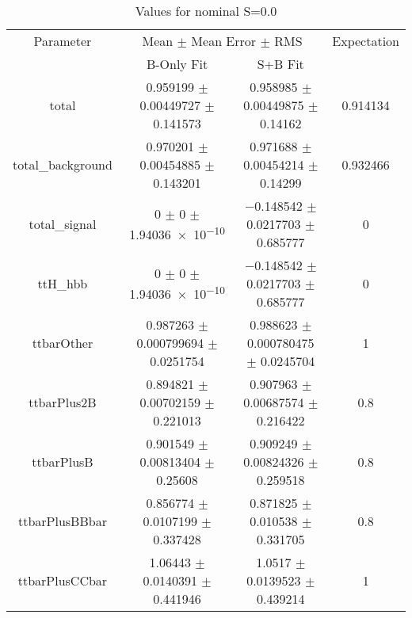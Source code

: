 \begin{table}
\centering
\caption{Values for nominal S=0.0}
\begin{tabular}{cccc}
\toprule
Parameter & \multicolumn{2}{c}{Mean $\pm$ Mean Error $\pm$ RMS} & Expectation\\
 & B-Only Fit & S+B Fit & \\
\midrule
total & \num{0.959199} $\pm$ \num{0.00449727} $\pm$ \num{0.141573} & \num{0.958985} $\pm$ \num{0.00449875} $\pm$ \num{0.14162} & \num{0.914134}\\
total\_background & \num{0.970201} $\pm$ \num{0.00454885} $\pm$ \num{0.143201} & \num{0.971688} $\pm$ \num{0.00454214} $\pm$ \num{0.14299} & \num{0.932466}\\
total\_signal & \num{0} $\pm$ \num{0} $\pm$ \num{1.94036e-10} & \num{-0.148542} $\pm$ \num{0.0217703} $\pm$ \num{0.685777} & \num{0}\\
ttH\_hbb & \num{0} $\pm$ \num{0} $\pm$ \num{1.94036e-10} & \num{-0.148542} $\pm$ \num{0.0217703} $\pm$ \num{0.685777} & \num{0}\\
ttbarOther & \num{0.987263} $\pm$ \num{0.000799694} $\pm$ \num{0.0251754} & \num{0.988623} $\pm$ \num{0.000780475} $\pm$ \num{0.0245704} & \num{1}\\
ttbarPlus2B & \num{0.894821} $\pm$ \num{0.00702159} $\pm$ \num{0.221013} & \num{0.907963} $\pm$ \num{0.00687574} $\pm$ \num{0.216422} & \num{0.8}\\
ttbarPlusB & \num{0.901549} $\pm$ \num{0.00813404} $\pm$ \num{0.25608} & \num{0.909249} $\pm$ \num{0.00824326} $\pm$ \num{0.259518} & \num{0.8}\\
ttbarPlusBBbar & \num{0.856774} $\pm$ \num{0.0107199} $\pm$ \num{0.337428} & \num{0.871825} $\pm$ \num{0.010538} $\pm$ \num{0.331705} & \num{0.8}\\
ttbarPlusCCbar & \num{1.06443} $\pm$ \num{0.0140391} $\pm$ \num{0.441946} & \num{1.0517} $\pm$ \num{0.0139523} $\pm$ \num{0.439214} & \num{1}\\
\bottomrule
\end{tabular}
\end{table}